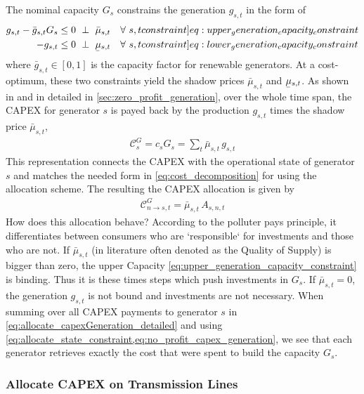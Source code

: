 \documentclass[11pt,twocolumn]{article}
\newcommand{\ubar}[1]{\underaccent{\bar}{#1}}
\newcommand{\resultsin}[1]{\hspace{6pt} \bot  \hspace{6pt} #1}
\newcommand{\Forall}[1]{\hspace{10pt} \forall \,\, #1 }
\newcommand{\generation}{g_{s,t}}
\newcommand{\generationpotential}{\bar{g}_{s,t}}
\newcommand{\capacitygeneration}{G_{s}}
\newcommand{\capitalpricegeneration}{c_{s}}
\newcommand{\mulowergeneration}{\ubar{\mu}_{s,t}}
\newcommand{\muuppergeneration}{\bar{\mu}_{s,t}}
\newcommand{\allocatepeer}[1][s, n]{A_{#1,t}}
\newcommand{\allocatecapexgeneration}[1][n]{\mathcal{C}^{G}_{#1,t}}
\newcommand{\capexgeneration}{\mathcal{C}^G}
\begin{document}
The nominal capacity $\capacitygeneration$ constrains the generation $\generation$ in the form of 
\begin{align}
\generation - \generationpotential \capacitygeneration  &\le 0 \resultsin{\muuppergeneration} \Forall{s,t} 
\label[constraint]{eq:upper_generation_capacity_constraint}\\ 
- \generation &\le 0 \resultsin{\mulowergeneration} \Forall{s,t} 
\label[constraint]{eq:lower_generation_capacity_constraint}
\end{align}
where $\generationpotential \in \left[ 0,1\right]$ is the capacity factor for renewable generators. At a cost-optimum, these two constraints yield the shadow prices $\muuppergeneration$ and $\mulowergeneration$.  As shown in \cite{brown_decreasing_2020} and in detailed in \cref{sec:zero_profit_generation}, over the whole time span, the CAPEX for generator $s$ is payed back by the production $\generation$ times the shadow price $\muuppergeneration$, 
\begin{align}
 \capexgeneration_s = \capitalpricegeneration \capacitygeneration = \sum_t \muuppergeneration \,  \generation 
 \label{eq:no_profit_capex_generation}
\end{align}
This representation connects the CAPEX with the operational state of generator $s$ and matches the needed form in \cref{eq:cost_decomposition} for using the allocation scheme. The resulting the CAPEX allocation is given by
\begin{align}
 \allocatecapexgeneration[n \rightarrow s] = \muuppergeneration \, \allocatepeer
 \label{eq:allocate_capexGeneration_detailed}
\end{align}
How does this allocation behave? According to the polluter pays principle, it differentiates between consumers who are `responsible` for investments and those who are not. If $\muuppergeneration$ (in literature often denoted as the Quality of Supply) is bigger than zero, the upper Capacity \cref{eq:upper_generation_capacity_constraint} is binding. Thus it is these times steps which push investments in $\capacitygeneration$. If $\muuppergeneration = 0$, the generation $\generation$ is not bound and investments are not necessary. 
When summing over all CAPEX payments to generator $s$ in \cref{eq:allocate_capexGeneration_detailed} and using \cref{eq:allocate_state_constraint,eq:no_profit_capex_generation}, we see that each generator retrieves exactly the cost that were spent to build the capacity $\capacitygeneration$.
 

\subsubsection*{Allocate CAPEX on Transmission Lines}
\end{document}
